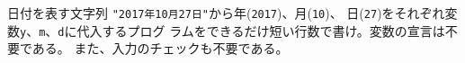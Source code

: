 \begin{Prob}\upshape\Must
日付を表す文字列 \Verb+"2017年10月27日"+から年(\Verb+2017+)、月(\Verb+10+)、
 日(\Verb+27+)をそれぞれ変数\Verb+y+、\Verb+m+、\Verb+d+に代入するプログ
 ラムをできるだけ短い行数で書け。\ifText 変数の宣言は不要である。
 また、入力のチェックも不要である。\\[0.02\textheight]\fi
\end{Prob}
